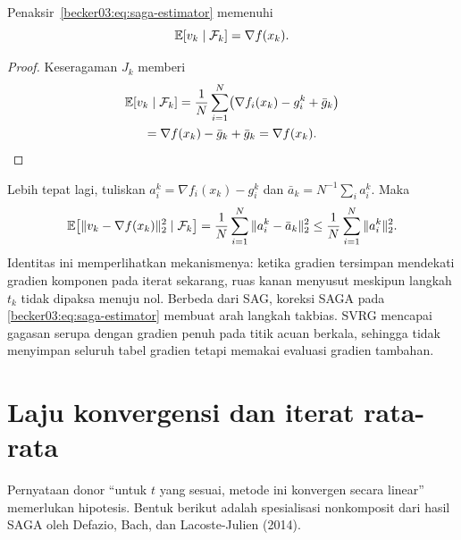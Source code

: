 \begin{prop}
  \label{becker03:prop:conditional-unbiasedness}
  Penaksir~\eqref{becker03:eq:saga-estimator} memenuhi
  \begin{equation}
    \mathbb{E}[v_k\mid\mathcal F_k]=\nabla f(x_k).
  \end{equation}
\end{prop}
\begin{proof}
  Keseragaman $J_k$ memberi
  \begin{multline*}
    \mathbb{E}[v_k\mid\mathcal F_k]
    =\frac1N\sum_{i=1}^{N}
      \bigl(\nabla f_i(x_k)-g_i^k+\bar g_k\bigr)\\
    =\nabla f(x_k)-\bar g_k+\bar g_k
      =\nabla f(x_k).
  \end{multline*}
\end{proof}

Lebih tepat lagi, tuliskan
$a_i^k=\nabla f_i(x_k)-g_i^k$ dan
$\bar a_k=N^{-1}\sum_i a_i^k$. Maka
\begin{equation}
  \label{becker03:eq:variance-identity}
  \mathbb{E}\!\left[
    \|v_k-\nabla f(x_k)\|_2^2\mid\mathcal F_k
  \right]
  =\frac1N\sum_{i=1}^{N}\|a_i^k-\bar a_k\|_2^2
  \leq\frac1N\sum_{i=1}^{N}\|a_i^k\|_2^2.
\end{equation}
Identitas ini memperlihatkan mekanismenya: ketika gradien tersimpan mendekati
gradien komponen pada iterat sekarang, ruas kanan menyusut meskipun langkah
$t_k$ tidak dipaksa menuju nol. Berbeda dari SAG, koreksi SAGA pada
\eqref{becker03:eq:saga-estimator} membuat arah langkah takbias. SVRG mencapai
gagasan serupa dengan gradien penuh pada titik acuan berkala, sehingga tidak
menyimpan seluruh tabel gradien tetapi memakai evaluasi gradien tambahan.

\section{Laju konvergensi dan iterat rata-rata}
\label{becker03:section:rates}

Pernyataan donor ``untuk $t$ yang sesuai, metode ini konvergen secara linear''
memerlukan hipotesis. Bentuk berikut adalah spesialisasi nonkomposit dari hasil
SAGA oleh Defazio, Bach, dan Lacoste-Julien (2014).

